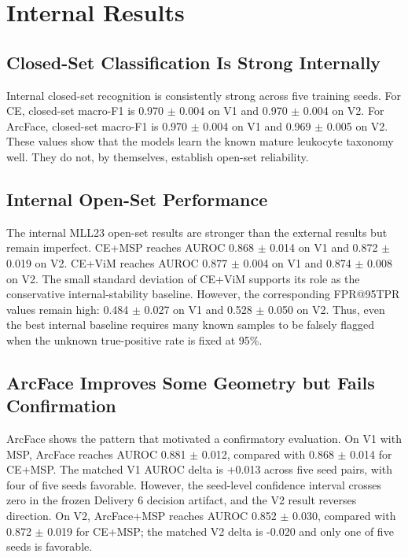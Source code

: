 \section{Internal Results}

\subsection{Closed-Set Classification Is Strong Internally}

Internal closed-set recognition is consistently strong across five training seeds. For CE, closed-set macro-F1 is 0.970 $\pm$ 0.004 on V1 and 0.970 $\pm$ 0.004 on V2. For ArcFace, closed-set macro-F1 is 0.970 $\pm$ 0.004 on V1 and 0.969 $\pm$ 0.005 on V2. These values show that the models learn the known mature leukocyte taxonomy well. They do not, by themselves, establish open-set reliability.

\subsection{Internal Open-Set Performance}

The internal MLL23 open-set results are stronger than the external results but remain imperfect. CE+MSP reaches AUROC 0.868 $\pm$ 0.014 on V1 and 0.872 $\pm$ 0.019 on V2. CE+ViM reaches AUROC 0.877 $\pm$ 0.004 on V1 and 0.874 $\pm$ 0.008 on V2. The small standard deviation of CE+ViM supports its role as the conservative internal-stability baseline. However, the corresponding FPR@95TPR values remain high: 0.484 $\pm$ 0.027 on V1 and 0.528 $\pm$ 0.050 on V2. Thus, even the best internal baseline requires many known samples to be falsely flagged when the unknown true-positive rate is fixed at 95\%.



\subsection{ArcFace Improves Some Geometry but Fails Confirmation}

ArcFace shows the pattern that motivated a confirmatory evaluation. On V1 with MSP, ArcFace reaches AUROC 0.881 $\pm$ 0.012, compared with 0.868 $\pm$ 0.014 for CE+MSP. The matched V1 AUROC delta is +0.013 across five seed pairs, with four of five seeds favorable. However, the seed-level confidence interval crosses zero in the frozen Delivery 6 decision artifact, and the V2 result reverses direction. On V2, ArcFace+MSP reaches AUROC 0.852 $\pm$ 0.030, compared with 0.872 $\pm$ 0.019 for CE+MSP; the matched V2 delta is -0.020 and only one of five seeds is favorable.

